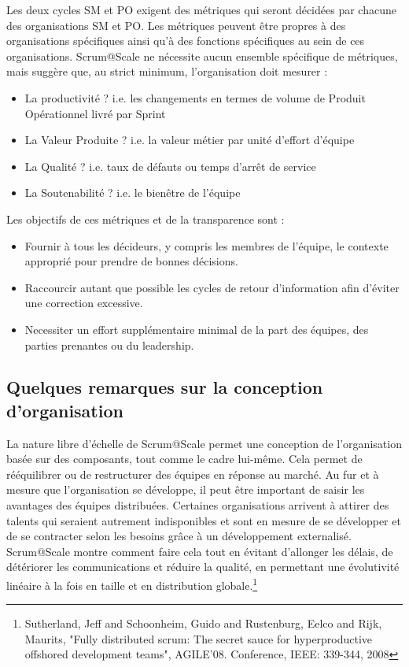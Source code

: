 \documentclass[12pt,a4paper,parskip=full]{scrartcl}
\begin{document}
Les deux cycles SM et PO exigent des métriques qui seront décidées par chacune des
organisations SM et PO. Les métriques peuvent être propres à des organisations
spécifiques ainsi qu'à des fonctions spécifiques au sein de ces organisations.
Scrum@Scale ne nécessite aucun ensemble spécifique de métriques, mais suggère que,
au strict minimum, l'organisation doit mesurer :
\begin{itemize}
\item La productivité ? i.e. les changements en termes de volume de Produit
Opérationnel livré par Sprint
\item La Valeur Produite ? i.e. la valeur métier par unité d'effort d'équipe
\item La Qualité ? i.e. taux de défauts ou temps d'arrêt de service
\item La Soutenabilité ? i.e. le bienêtre de l'équipe
\end{itemize}
Les objectifs de ces métriques et de la transparence sont :
\begin{itemize}
  \item Fournir à tous les décideurs, y compris les membres de l'équipe, le contexte
approprié pour prendre de bonnes décisions.
\item Raccourcir autant que possible les cycles de retour d'information afin d'éviter
une correction excessive.
\item Necessiter un effort supplémentaire minimal de la part des équipes, des parties
prenantes ou du leadership.
 \end{itemize}

\subsection{Quelques remarques sur la conception d'organisation}
La nature libre d'échelle de Scrum@Scale permet une conception de l'organisation
basée sur des composants, tout comme le cadre lui-même. Cela permet de
rééquilibrer ou de restructurer des équipes en réponse au marché. Au fur et à mesure
que l'organisation se développe, il peut être important de saisir les avantages des
équipes distribuées. Certaines organisations arrivent à attirer des talents qui seraient
autrement indisponibles et sont en mesure de se développer et de se contracter selon
les besoins grâce à un développement externalisé. Scrum@Scale montre comment
faire cela tout en évitant d'allonger les délais, de détériorer les communications et
réduire la qualité, en permettant une évolutivité linéaire à la fois en taille et en
distribution globale.\footnote{Sutherland, Jeff and Schoonheim,
Guido and Rustenburg, Eelco and Rijk, Maurits, "Fully distributed scrum:
The secret sauce for hyperproductive offshored development teams",
AGILE'08. Conference, IEEE: 339-344, 2008}
\end{document}
